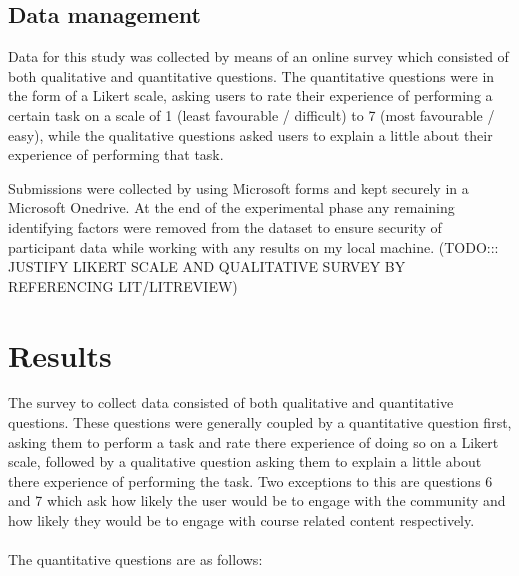 \documentclass[lettersize,journal]{IEEEtran}
\begin{document}
	\subsection{Data management}
		Data for this study was collected by means of an online survey which consisted of both qualitative and quantitative questions. The quantitative
		questions were in the form of a Likert scale, asking users to rate their experience of performing a certain task on a scale of 1 (least favourable
		/ difficult) to 7 (most favourable / easy), while the qualitative questions asked users to explain a little about their experience of performing
		 that task.

		Submissions were collected by using Microsoft forms and kept securely in a Microsoft Onedrive. At the end of the experimental phase any remaining
		identifying factors were removed from the dataset to ensure security of participant data while working with any results on my local machine.
		(TODO::: JUSTIFY LIKERT SCALE AND QUALITATIVE SURVEY BY REFERENCING LIT/LITREVIEW)

\section{Results}

 The survey to collect data consisted of both qualitative and quantitative questions. These questions were generally coupled by a quantitative question first, asking them to perform a task and 
 rate there experience of doing so on a Likert scale, followed by a qualitative question asking them to explain a little about there experience of performing the task. Two exceptions to this are questions
 6 and 7 which ask how likely the user would be to engage with the community and how likely they would be to engage with course related content respectively.
 \\
 \\
 The quantitative questions are as follows:
\\
\end{document}
